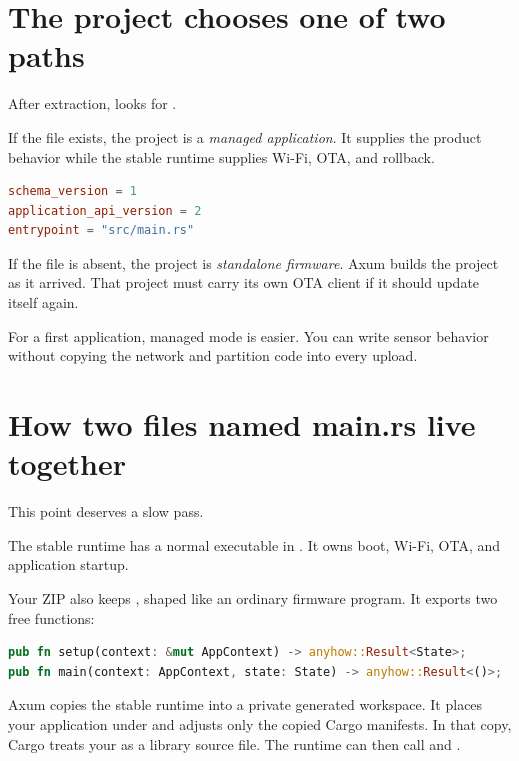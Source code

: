 \section{The project chooses one of two paths}

After extraction,  looks for .

If the file exists, the project is a \emph{managed application}. It supplies the product behavior while the stable runtime supplies Wi-Fi, OTA, and rollback.

\begin{lstlisting}[language=TOML,numbers=none]
schema_version = 1
application_api_version = 2
entrypoint = "src/main.rs"
\end{lstlisting}

If the file is absent, the project is \emph{standalone firmware}. Axum builds the project as it arrived. That project must carry its own OTA client if it should update itself again.

For a first application, managed mode is easier. You can write sensor behavior without copying the network and partition code into every upload.

\section{How two files named main.rs live together}

This point deserves a slow pass.

The stable runtime has a normal executable  in . It owns boot, Wi-Fi, OTA, and application startup.

Your ZIP also keeps , shaped like an ordinary firmware program. It exports two free functions:

\begin{lstlisting}[language=Rust]
pub fn setup(context: &mut AppContext) -> anyhow::Result<State>;
pub fn main(context: AppContext, state: State) -> anyhow::Result<()>;
\end{lstlisting}

Axum copies the stable runtime into a private generated workspace. It places your application under  and adjusts only the copied Cargo manifests. In that copy, Cargo treats your  as a library source file. The runtime can then call  and .

